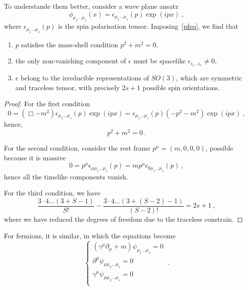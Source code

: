     To understande them better, consider a wave plane ansatz 
    \begin{equation*}
        \phi_{\mu_1 \ldots \mu_s} (x) = \epsilon_{\mu_1 \ldots \mu_s} (p) \exp(i p x) ~,
    \end{equation*}
    where $\epsilon_{\mu_1 \ldots \mu_s} (p) $ is the spin polarisation tensor. Imposing~\eqref{pfeq}, we find that 
    \begin{enumerate}
        \item $p$ satisfies the mass-shell condition $p^2 + m^2 = 0$,
        \item the only non-vanishing component of $\epsilon$ must be spacelike $\epsilon_{i_1 \ldots i_s} \neq 0$,
        \item $\epsilon$ belong to the irreducible representations of $SO(3)$, which are symmetric and traceless tensor, with precisely $2s+1$ possible spin orientations.
    \end{enumerate}
    \begin{proof}
        For the first condition 
        \begin{equation*}
            0 = (\Box - m^2) \epsilon_{\mu_1 \ldots \mu_s} (p) \exp(i p x) = \epsilon_{\mu_1 \ldots \mu_s} (p) (- p^2 - m^2) \exp(i p x) ~,
        \end{equation*} 
        hence, 
        \begin{equation*}
            p^2 + m^2 = 0 ~.
        \end{equation*}

        For the second condition, consider the rest frame $p^\mu = (m,0,0,0)$, possible because it is massive
        \begin{equation*}
            0 = p^\mu \epsilon_{\mu \mu_1 \ldots \mu_s} (p) = m p^\mu \epsilon_{0 \mu_1 \ldots \mu_s} (p) ~,
        \end{equation*}
        hence all the timelike components vanish.

        For the third condition, we have 
        \begin{equation*}
            \frac{3 \cdot 4 \ldots (3+S-1)}{S!} - \frac{3 \cdot 4 \ldots (3+(S-2)-1)}{(S-2)!} = 2 s + 1 ~,
        \end{equation*}
        where we have reduced the degrees of freedom due to the traceless constrain.
    \end{proof}

    For fermions, it is similar, in which the equations become 
    \begin{equation*}
        \begin{cases}
            (\gamma^\mu \partial_\mu + m) \psi_{\mu_1 \ldots \mu_s} = 0 \\
            \partial^\mu \psi_{\mu \mu_2 \ldots \mu_s} = 0 \\
            \gamma^{\mu} \psi_{\mu \mu_2 \ldots \mu_s} = 0 \\
        \end{cases} ~.
    \end{equation*}

